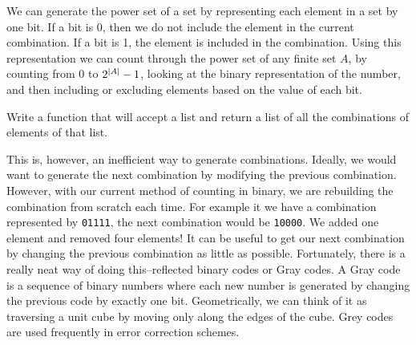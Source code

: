 We can generate the power set of a set by representing each element in a set by one bit.
If a bit is 0, then we do not include the element in the current combination.  If a
bit is 1, the element is included in the combination.
Using this representation we can count through the power set of any finite set $A$, by counting from 0 to $2^{\left\lvert A\right\rvert}-1$, looking at the binary representation of the number, and then including or excluding elements based on the value of each bit.

\begin{problem}
Write a function that will accept a list and return a list of all the combinations
of elements of that list.
\end{problem}

This is, however, an inefficient way to generate combinations.  Ideally, we would want
to generate the next combination by modifying the previous combination.  However, with
our current method of counting in binary, we are rebuilding the combination from scratch
each time.  For example it we have a combination represented by \texttt{01111}, the next
combination would be \texttt{10000}.  We added one element and removed four elements!
It can be useful to get our next combination by changing the previous combination as little as possible.
Fortunately, there is a really neat way of doing this--reflected binary codes or Gray codes. 
A Gray code is a sequence of binary numbers where each new number is generated by
changing the previous code by exactly one bit.  Geometrically, we can think of it as
traversing a unit cube by moving only along the edges of the cube.
Grey codes are used frequently in error correction schemes.

